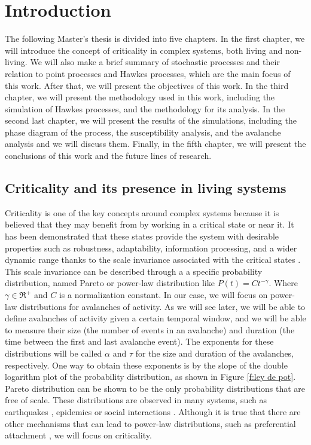 \chapter{Introduction}\label{ch:intro}

The following Master's thesis is divided into five chapters. In the first chapter, we will introduce the concept of criticality in complex systems, both living and non-living.  
We will also make a brief summary of stochastic processes and their relation to point processes and Hawkes processes, which are the main focus of this work.
After that, we will present the objectives of this work. In the third chapter, we will present the methodology used in this work, including the simulation of Hawkes processes, 
and the methodology for its analysis. In the second last chapter, we will present the results of the simulations, including the phase diagram of the process, the 
susceptibility analysis, and the avalanche analysis and we will discuss them. Finally, in the fifth chapter, we will present the conclusions of this work and the future lines of research.

\section{Criticality and its presence in living systems}

Criticality is one of the key concepts around complex systems because it is believed that they may benefit from by working in a critical state or near it. It has been demonstrated that
these states provide the system with desirable properties such as robustness, adaptability, information processing, and a wider dynamic range thanks to the scale invariance associated with the
critical states \cite{munoz2018colloquium}. This scale invariance can be described through a a specific probability distribution, named Pareto or power-law distribution like $P(t) = Ct^{-\gamma}$.
Where $\gamma\in\Re^+$ and $C$ is a normalization constant. In our case, we will focus on power-law distributions for avalanches of activity. As we will see later, we will be able to define 
avalanches of activity given a certain temporal window, and we will be able to measure their size (the number of events in an avalanche) and duration (the time between the first and last 
avalanche event). The exponents for these distributions will be called $\alpha$ and $\tau$ for the size and duration of the avalanches, respectively. One way to obtain these exponents is by 
the slope of the double logarithm plot of the probability distribution, as shown in Figure \ref{f:ley de pot}.
Pareto distribution can be shown to be the only probability distributions that are free of scale. These distributions are observed
in many systems, such as earthquakes \cite{baiesi2004scale}, epidemics \cite{pastor2015epidemic} or social interactions \cite{castellano2009statistical, aparicio2015model}. 
Although it is true that there are other mechanisms that can lead to power-law distributions, such as preferential attachment \cite{barabasi1999emergence}, we will focus on criticality. 

